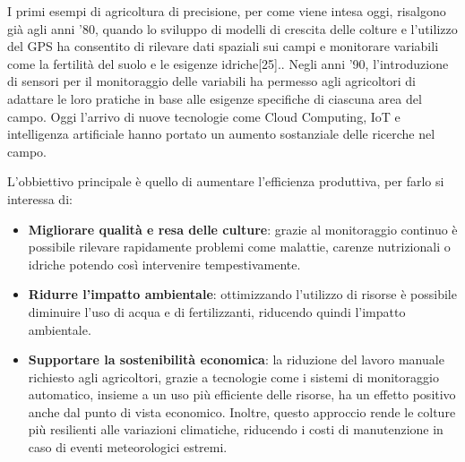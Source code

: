 \documentclass[12pt,a4paper,openright,twoside, openany]{book}
\begin{document}
I primi esempi di agricoltura di precisione, per come viene intesa oggi, risalgono già agli anni '80, quando lo sviluppo di modelli di crescita delle colture e l'utilizzo del \ac{GPS} ha consentito di rilevare dati spaziali sui campi e monitorare variabili come la fertilità del suolo e le esigenze idriche[25].\cite{201402720190101}.
Negli anni '90, l'introduzione di sensori per il monitoraggio delle variabili ha permesso agli agricoltori di adattare le loro pratiche in base alle esigenze specifiche di ciascuna area del campo\cite{201402720190101}.
Oggi l'arrivo di nuove tecnologie come Cloud Computing, \ac{IoT} e intelligenza artificiale hanno portato un aumento sostanziale delle ricerche nel campo\cite{WOLFERT201769}.

L'obbiettivo principale è quello di aumentare l'efficienza produttiva, per farlo si interessa di:
\begin{itemize}[noitemsep]
    \item \textbf{Migliorare qualità e resa delle culture}: grazie al monitoraggio continuo è possibile rilevare rapidamente problemi come malattie, carenze nutrizionali o idriche potendo così intervenire tempestivamente.
    \item \textbf{Ridurre l'impatto ambientale}: ottimizzando l'utilizzo di risorse è possibile diminuire l'uso di acqua e di fertilizzanti, riducendo quindi l'impatto ambientale.
    \item \textbf{Supportare la sostenibilità economica}: la riduzione del lavoro manuale richiesto agli agricoltori, grazie a tecnologie come i sistemi di monitoraggio automatico, insieme a un uso più efficiente delle risorse, ha un effetto positivo anche dal punto di vista economico. Inoltre, questo approccio rende le colture più resilienti alle variazioni climatiche, riducendo i costi di manutenzione in caso di eventi meteorologici estremi.
\end{itemize}
\end{document}
